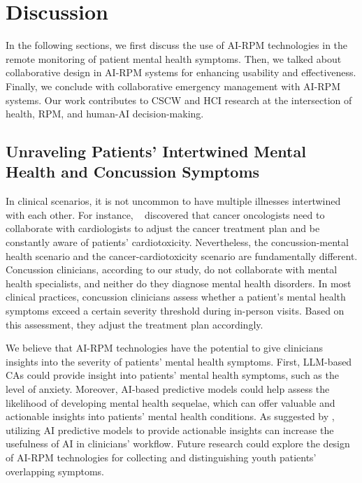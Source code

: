 \section{Discussion}
 
In the following sections, we first discuss the use of AI-RPM technologies in the remote monitoring of patient mental health symptoms.
Then, we talked about collaborative design in AI-RPM systems for enhancing usability and effectiveness.
Finally, we conclude with collaborative emergency management with AI-RPM systems. 
Our work contributes to CSCW and HCI research at the intersection of health, RPM, and human-AI decision-making.


\subsection{Unraveling Patients' Intertwined Mental Health and Concussion Symptoms}

In clinical scenarios, it is not uncommon to have multiple illnesses intertwined with each other.
For instance, ~\citet{wu2024cardioai} discovered that cancer oncologists need to collaborate with cardiologists to adjust the cancer treatment plan and be constantly aware of patients' cardiotoxicity.
Nevertheless, the concussion-mental health scenario and the cancer-cardiotoxicity scenario are fundamentally different.
Concussion clinicians, according to our study, do not collaborate with mental health specialists, and neither do they diagnose mental health disorders. 
In most clinical practices, concussion clinicians assess whether a patient's mental health symptoms exceed a certain severity threshold during in-person visits. Based on this assessment, they adjust the treatment plan accordingly.




We believe that AI-RPM technologies have the potential to give clinicians insights into the severity of patients' mental health symptoms.
First, LLM-based CAs could provide insight into patients' mental health symptoms, such as the level of anxiety. 
Moreover, AI-based predictive models could help assess the likelihood of developing mental health sequelae, which can offer valuable and actionable insights into patients' mental health conditions.
As suggested by \citet{bennett2012ehrs, zhang2024rethinking}, utilizing AI predictive models to provide actionable insights can increase the usefulness of AI in clinicians' workflow. 
Future research could explore the design of AI-RPM technologies for collecting and distinguishing youth patients’ overlapping symptoms.




